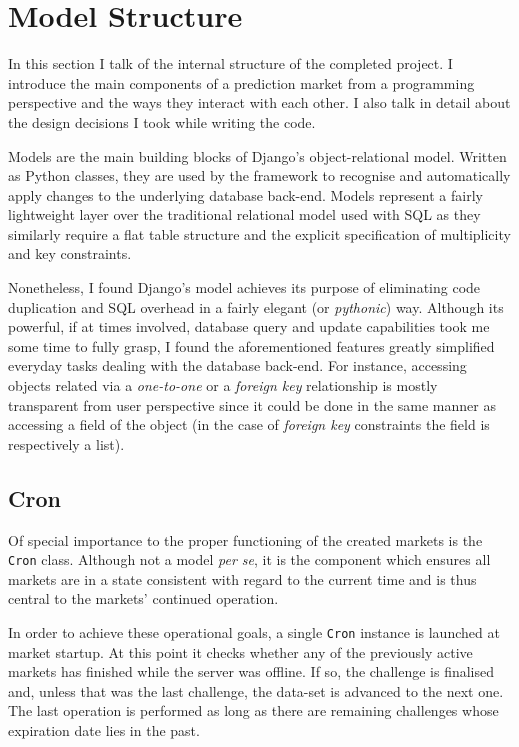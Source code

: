 \documentclass[bsc,frontabs,twoside,singlespacing,parskip,deptreport]{infthesis}     %
\begin{document}
\section{Model Structure}

In this section I talk of the internal structure of the completed project. I introduce the main components of a prediction market from a programming perspective and the ways they interact with each other. I also talk in detail about the design decisions I took while writing the code.

    Models are the main building blocks of Django's object-relational model. Written as Python classes, they are used by the framework to recognise and automatically apply changes to the underlying database back-end. Models represent a fairly lightweight layer over the traditional relational model used with SQL as they similarly require a flat table structure and the explicit specification of multiplicity and key constraints. 

	Nonetheless, I found Django's model achieves its purpose of eliminating code duplication and SQL overhead in a fairly elegant (or {\em pythonic}) way. Although its powerful, if at times involved, database query and update capabilities took me some time to fully grasp, I found the aforementioned features greatly simplified everyday tasks dealing with the database back-end. For instance, accessing objects related via a {\it one-to-one} or a {\it foreign key} relationship is mostly transparent from user perspective since it could be done in the same manner as accessing a field of the object (in the case of {\it foreign key} constraints the field is respectively a list). 

\subsection{Cron}

	Of special importance to the proper functioning of the created markets is the {\tt Cron} class. Although not a model {\it per se}, it is the component which ensures all markets are in a state consistent with regard to the current time and is thus central to the markets' continued operation. 

	In order to achieve these operational goals, a single {\tt Cron} instance is launched at market startup. At this point it checks whether any of the previously active markets has finished while the server was offline. If so, the challenge is finalised and, unless that was the last challenge, the data-set is advanced to the next one. The last operation is performed as long as there are remaining challenges whose expiration date lies in the past. 
\end{document}
